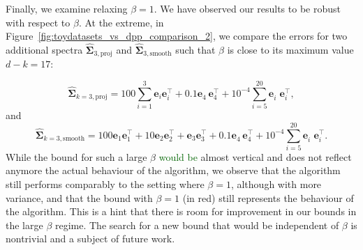 \documentclass[twoside,11pt]{book}
\newcommand{\rev}[1]{\textcolor{darkgreen}{#1}}
\numberwithin{theorem}{chapter}
\numberwithin{definition}{chapter}
\numberwithin{proposition}{chapter}
\numberwithin{corollary}{chapter}
\numberwithin{example}{chapter}
\numberwithin{lemma}{chapter}
\DeclareMathOperator{\Tran}{\intercal}
\begin{document}
Finally, we examine relaxing $\beta=1$. We have observed our results to be robust with respect to $\beta$. At the extreme, in Figure~\ref{fig:toydatasets_vs_dpp_comparison_2}, we compare the errors for two additional spectra $\hat{\bm{\Sigma}}_{3,\text{proj}}$ and $\hat{\bm{\Sigma}}_{3,\text{smooth}}$ such that $\beta$ is close to its maximum value $d-k = 17$:

$$
    \hat{\bm{\Sigma}}_{k=3,\text{proj}} = 100 \sum\limits_{i = 1}^{3} \bm{e}_{i}\bm{e}_{i}^{\Tran} + 0.1\bm{e}_{4}^{\phantom{\Tran}}\bm{e}_{4}^{\Tran} + 10^{-4} \sum\limits_{i = 5}^{20} \bm{e}_{i}^{\phantom{\Tran}}\bm{e}_{i}^{\Tran}, $$
and
$$
    \hat{\bm{\Sigma}}_{k=3,\text{smooth}} = 100\bm{e}_{1}\bm{e}_{1}^{\Tran} + 10\bm{e}_{2}\bm{e}_{2}^{\Tran} + \bm{e}_{3}\bm{e}_{3}^{\Tran} + 0.1\bm{e}_{4}^{\phantom{\Tran}}\bm{e}_{4}^{\Tran} + 10^{-4} \sum\limits_{i = 5}^{20} \bm{e}_{i}^{\phantom{\Tran}}\bm{e}_{i}^{\Tran}.$$
 While the bound for such a large $\beta$ \rev{would be} almost vertical and does not reflect anymore the actual behaviour of the algorithm, we observe that the algorithm still performs comparably to the setting where $\beta=1$, although with more variance, and that the bound with $\beta = 1$ (in red) still represents the behaviour of the algorithm. This is a hint that there is room for improvement in our bounds in the large $\beta$ regime. The search for a new bound that would be independent of $\beta$ is nontrivial and a subject of future work.
\end{document}
